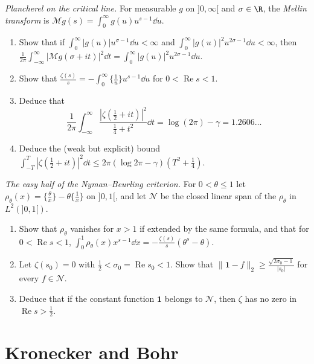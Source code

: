 \begin{exercise}[$\star\star$]\label{pb:zetamellin}
\emph{Plancherel on the critical line.} For measurable $g$ on $]0,\infty[$ and $\sigma\in\R$, the \emph{Mellin transform} is $\mathcal Mg(s)=\int_0^\infty g(u)u^{s-1}\dd u$.
\begin{enumerate}[label=(\alph*)]
\item Show that if $\int_0^\infty|g(u)|u^{\sigma-1}\dd u<\infty$ and $\int_0^\infty|g(u)|^2u^{2\sigma-1}\dd u<\infty$, then
$\frac1{2\pi}\int_{-\infty}^\infty|\mathcal Mg(\sigma+it)|^2\dd t=\int_0^\infty|g(u)|^2u^{2\sigma-1}\dd u$.
\item Show that $\frac{\zeta(s)}s=-\int_0^\infty\bigl\{\frac1u\bigr\}u^{s-1}\dd u$ for $0<\operatorname{Re}s<1$.
\item Deduce that
\[
\frac1{2\pi}\int_{-\infty}^\infty\frac{|\zeta(\frac12+it)|^2}{\frac14+t^2}\dd t=\log(2\pi)-\gamma=1.2606\ldots
\]
\item Deduce the (weak but explicit) bound $\int_{-T}^T|\zeta(\frac12+it)|^2\dd t\le2\pi(\log2\pi-\gamma)(T^2+\frac14)$.
\end{enumerate}
\end{exercise}

\begin{exercise}[$\star\star\star$]\label{pb:nyman}
\emph{The easy half of the Nyman--Beurling criterion.} For $0<\theta\le1$ let $\rho_\theta(x)=\{\frac\theta x\}-\theta\{\frac1x\}$ on $]0,1[$, and let $\mathcal N$ be the closed
linear span of the $\rho_\theta$ in $L^2(]0,1[)$.
\begin{enumerate}[label=(\alph*)]
\item Show that $\rho_\theta$ vanishes for $x>1$ if extended by the same formula, and that for $0<\operatorname{Re}s<1$,
$\int_0^1\rho_\theta(x)x^{s-1}\dd x=-\frac{\zeta(s)}s(\theta^s-\theta)$.
\item Let $\zeta(s_0)=0$ with $\frac12<\sigma_0=\operatorname{Re}s_0<1$. Show that $\|\mathbf 1-f\|_2\ge\frac{\sqrt{2\sigma_0-1}}{|s_0|}$ for every $f\in\mathcal N$.
\item Deduce that if the constant function $\mathbf 1$ belongs to $\mathcal N$, then $\zeta$ has no zero in $\operatorname{Re}s>\frac12$.
\end{enumerate}
\end{exercise}

\section{Kronecker and Bohr}

